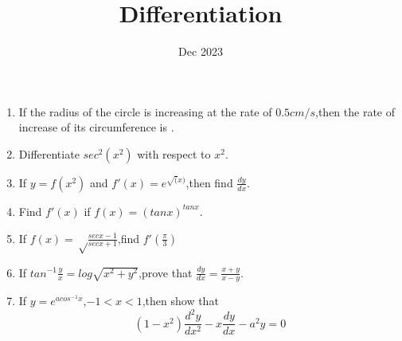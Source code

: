 \documentclass{article}
\title{Differentiation}
\date{Dec 2023}
\begin{document}
\maketitle
\begin{enumerate}
\item If the radius of the circle is increasing at the rate of $0.5cm/s$,then the rate of increase of its circumference is .

\item Differentiate $sec^2(x^2)$ with respect to $x^2$.

\item If $y=f(x^2)$ and $f'(x)=e^{\sqrt(x)}$,then find $\frac{dy}{dx}$.

\item Find $f'(x)$ if $f(x)=(tan x)^{tan x}$.

\item If $f(x)=\sqrt\frac{sec x -1}{sec x + 1}$,find $f'(\frac{\pi}{3})$

\item If $tan^{-1}\frac{y}{x}= log\sqrt{x^2 + y^2}$,prove that $\frac{dy}{dx}=\frac{x+y}{x-y}$.

\item If $y=e^{a cos^{-1}x}$,$-1<x<1$,then show that
	$$(1-x^2)\frac{d^2y}{dx^2}-x\frac{dy}{dx}-a^2y=0$$
\end{enumerate}
\end{document}
